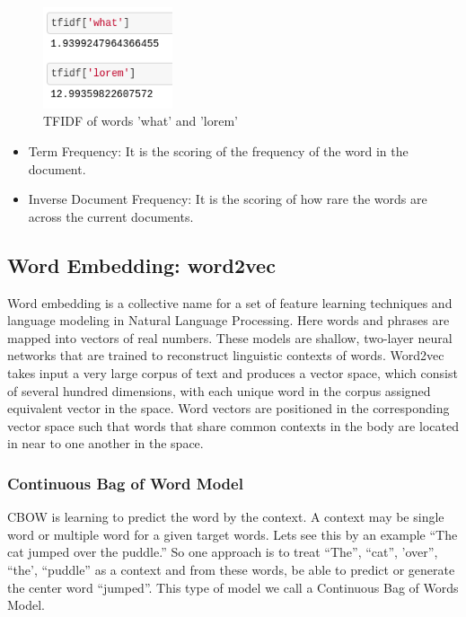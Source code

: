 \begin{figure}[tbh]
\begin{center}
	\includegraphics[width = 1.5in]{images/some_tfidf.png}
	\caption{\ac{TFIDF} of words 'what' and 'lorem'}
	\label{some_tfidf}
\end{center}
\end{figure}

\begin{itemize}
\item Term Frequency: It is the scoring of the frequency of the word in the document.
\item Inverse Document Frequency: It is the scoring of how rare the words are across the current documents.
\end{itemize} 

\subsection{Word Embedding: word2vec}
Word embedding is a collective name for a set of feature learning techniques and language modeling in Natural Language Processing. Here words and phrases are mapped into vectors of real numbers. These models are shallow, two-layer neural networks that are trained to reconstruct linguistic contexts of words. Word2vec \cite{DBLPRong14} takes input a very large corpus of text and produces a vector space, which consist of several hundred dimensions, with each unique word in the corpus assigned equivalent vector in the space. Word vectors are positioned in the corresponding vector space such that words that share common contexts in the body are located in near to one another in the space. 

\subsubsection{Continuous Bag of Word Model}
\ac{CBOW} is learning to predict the word by the context. A context may be single word or multiple word for a given target words. Lets see this by an example “The cat jumped over the puddle.” So one approach is to treat {“The”, “cat”, ’over”, “the’, “puddle”} as a context and from these words, be able to predict or generate the center word “jumped”. This type of model we call a Continuous Bag of Words  Model.

